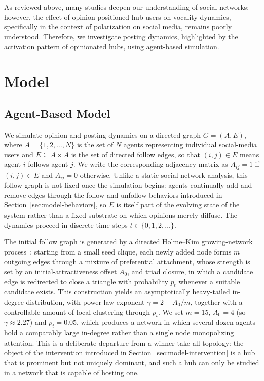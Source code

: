 \documentclass{svproc}
\begin{document}
As reviewed above, many studies deepen our understanding of social networks;
however, the effect of opinion-positioned hub users on vocality dynamics,
specifically in the context of polarization on social media, remains poorly
understood.
Therefore, we investigate posting dynamics, highlighted by the activation
pattern of opinionated hubs, using agent-based simulation.



\section{Model}\label{sec:model}

\subsection{Agent-Based Model}\label{sec:model-abm}

We simulate opinion and posting dynamics on a directed graph $G=(A,E)$, where $A=\{1,2,\dots,N\}$ is the set of $N$ agents representing individual social-media users and $E\subseteq A\times A$ is the set of directed follow edges, so that $(i,j)\in E$ means agent $i$ follows agent $j$. We write the corresponding adjacency matrix as $A_{ij}=1$ if $(i,j)\in E$ and $A_{ij}=0$ otherwise. Unlike a static social-network analysis, this follow graph is not fixed once the simulation begins: agents continually add and remove edges through the follow and unfollow behaviors introduced in Section~\ref{sec:model-behaviors}, so $E$ is itself part of the evolving state of the system rather than a fixed substrate on which opinions merely diffuse. The dynamics proceed in discrete time steps $t\in\{0,1,2,\dots\}$.

The initial follow graph is generated by a directed Holme--Kim growing-network process~\cite{holme2002}: starting from a small seed clique, each newly added node forms $m$ outgoing edges through a mixture of preferential attachment, whose strength is set by an initial-attractiveness offset $A_0$, and triad closure, in which a candidate edge is redirected to close a triangle with probability $p_t$ whenever a suitable candidate exists. This construction yields an asymptotically heavy-tailed in-degree distribution, with power-law exponent $\gamma=2+A_0/m$, together with a controllable amount of local clustering through $p_t$. We set $m=15$, $A_0=4$ (so $\gamma\approx2.27$) and $p_t=0.05$, which produces a network in which several dozen agents hold a comparably large in-degree rather than a single node monopolizing attention. This is a deliberate departure from a winner-take-all topology: the object of the intervention introduced in Section~\ref{sec:model-intervention} is a hub that is prominent but not uniquely dominant, and such a hub can only be studied in a network that is capable of hosting one.
\end{document}
